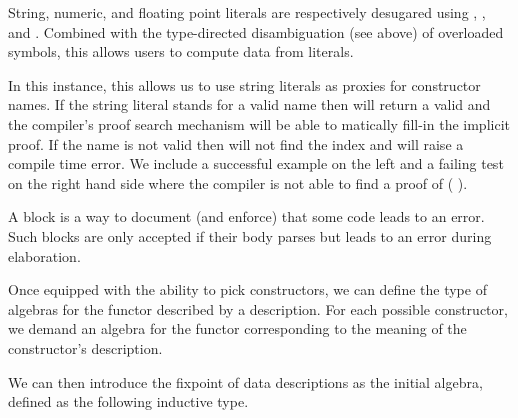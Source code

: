 
\begin{remark}
  String, numeric, and floating point literals are respectively
  desugared using , , and
  .
  Combined with the type-directed disambiguation (see above)
  of overloaded symbols, this allows users to compute data from literals.
\end{remark}

In this instance, this allows us to use string literals as
proxies for constructor names.
%
If the string literal stands for a valid name then
 will
return a valid  and the compiler's proof
search mechanism will be able to
matically fill-in the implicit proof.
%
If the name is not valid then \idris{} will not
find the index and will raise a compile time error.
%
We include a successful example on the left and a failing test
on the right hand side where the compiler is not able to find
a proof of ( \IdrisKeyword{(}
 
\IdrisKeyword{)}).

\noindent
\begin{minipage}[t]{0.35\textwidth}
\end{minipage}\hfill
\begin{minipage}[t]{0.42\textwidth}
\end{minipage}

\begin{remark}
  A  block is a way to document (and
  enforce) that some code leads to an error.
  Such blocks are only accepted if their body parses but
  leads to an error during elaboration.
\end{remark}

Once equipped with the ability to pick constructors, we can define
the type of algebras for the functor described by a 
description. For each possible constructor, we demand an algebra for
the functor corresponding to the meaning of the  constructor's description.


We can then introduce the fixpoint of data descriptions as the initial
algebra, defined as the following inductive type.

